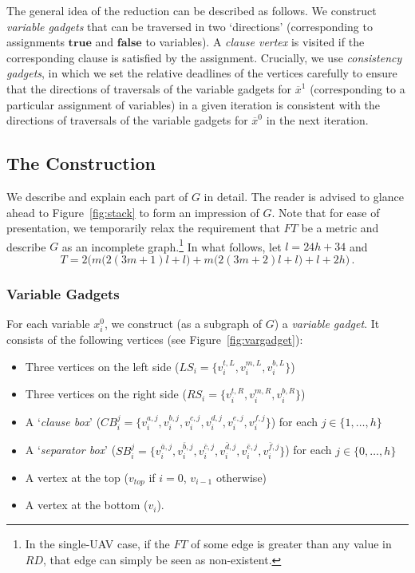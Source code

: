 \documentclass[envcountsame]{llncs}
\begin{document}
The general idea of the reduction can be described as follows. We
construct \emph{variable gadgets} that can be traversed in two
`directions' (corresponding to assignments $\mathbf{true}$ and
$\mathbf{false}$ to variables). A \emph{clause vertex} is visited if
the corresponding clause is satisfied by the assignment.  Crucially,
we use \emph{consistency gadgets}, in which we set the relative
deadlines of the vertices carefully to ensure that the directions of
traversals of the variable gadgets for $\overline{x}^1$ (corresponding
to a particular assignment of variables) in a given iteration is
consistent with the directions of traversals of the variable gadgets
for $\overline{x}^0$ in the next iteration.

\subsection{The Construction}

We describe and explain each part of $G$ in detail.
The reader is advised to glance ahead to Figure~\ref{fig:stack} to form an
impression of $G$.  Note that for ease of presentation, we temporarily
relax the requirement that $\mathit{FT}$ be a metric and describe $G$ as an incomplete graph.\footnote{In
  the single-UAV case, if the $\mathit{FT}$ of some edge is greater
  than any value in $\mathit{RD}$, that edge can simply be seen as
  non-existent.}  In what follows, let $l = 24h + 34$ and
\[T = 2
\Big( m\big(2 (3m+1)l + l\big) + m\big(2 (3m+2)l + l\big) + l + 2h
\Big)\,.\]

\subsubsection{Variable Gadgets}
For each variable $x^0_i$, we construct (as a subgraph of $G$) a \emph{variable gadget}.
It consists of the following vertices (see Figure~\ref{fig:vargadget}):
\begin{itemize}
\item Three vertices on the left side ($\mathit{LS}_i = \{v^{t, L}_i, v^{m, L}_i, v^{b, L}_i\}$)
\item Three vertices on the right side ($\mathit{RS}_i = \{v^{t, R}_i, v^{m, R}_i, v^{b, R}_i\}$)
\item A `\emph{clause box}' ($\mathit{CB}_{i}^j  = \{ v^{a, j}_{i}, v^{b, j}_{i}, v^{c, j}_{i}, v^{d, j}_{i}, v^{e, j}_{i}, v^{f, j}_{i} \}$) for each $j \in \{1, \ldots, h\}$
\item A `\emph{separator box}' ($\mathit{SB}_{i}^j = \{ v^{\bar{a}, j}_{i}, v^{\bar{b}, j}_{i}, v^{\bar{c}, j}_{i}, v^{\bar{d}, j}_{i}, v^{\bar{e}, j}_{i}, v^{\bar{f}, j}_{i} \}$) for each $j \in \{0, \ldots, h\}$
\item A vertex at the top ($v_{top}$ if $i = 0$, $v_{i-1}$ otherwise)
\item A vertex at the bottom ($v_i$).
\end{itemize}
\end{document}
